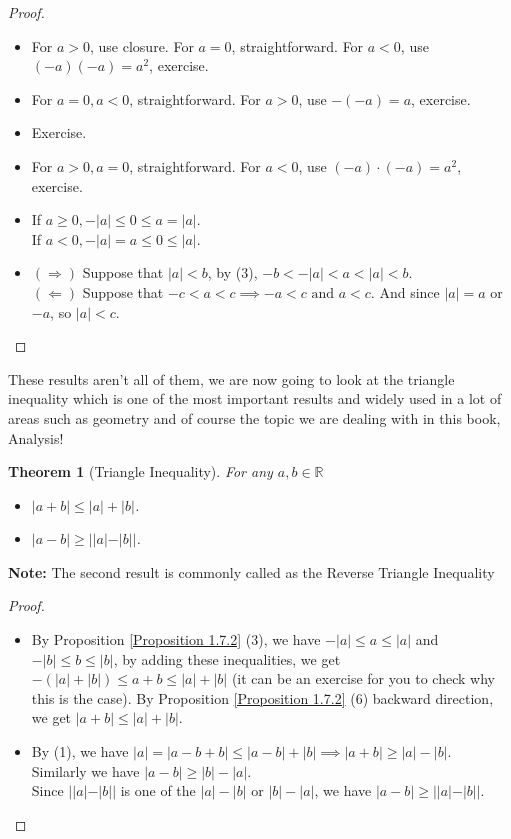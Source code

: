 \documentclass{book}
\newtheorem{theorem}{Theorem}[section]
\begin{document}
\begin{proof}
    \begin{itemize}[itemsep = 0pt]
        \item[(1)] For $a > 0$, use closure. For $a = 0$, straightforward. For $a < 0$, use $(-a)(-a) = a^{2}$, exercise.
        \item[(2)] For $a = 0, a < 0$, straightforward. For $a > 0$, use $-(-a) = a$, exercise.
        \item[(3)] Exercise.
        \item[(4)] For $a > 0, a = 0$, straightforward. For $a < 0$, use $(-a) \cdot (-a) = a^{2}$, exercise.
        \item[(5)] If $a \geq 0, -|a| \leq 0 \leq a = |a|$. \\
        If $a < 0, -|a| = a \leq 0 \leq |a|$.
        \item[(6)] $(\Rightarrow)$ Suppose that $|a| < b$, by (3), $-b < -|a| < a < |a| < b$. \\
        $(\Leftarrow)$ Suppose that $-c < a < c \implies -a < c \text{ and } a < c$. And since $|a| = a$ or $-a$, so $|a| < c$.
    \end{itemize}
\end{proof}
These results aren't all of them, we are now going to look at the triangle inequality which is one of the most important results and widely used in a lot of areas such as geometry and of course the topic we are dealing with in this book, Analysis!
\begin{theorem}[Triangle Inequality]
    For any $a, b \in \mathbb{R}$
    \begin{itemize}[itemsep = 0pt]
        \item[(1)] $|a + b| \leq |a| + |b|$.
        \item[(2)] $|a - b| \geq ||a| - |b||$.
    \end{itemize}
\end{theorem}

\textbf{Note:} The second result is commonly called as the Reverse Triangle Inequality
\begin{proof}
    \begin{itemize}[itemsep = 0pt]
        \item[(1)] By Proposition \ref{Proposition 1.7.2} (3), we have $-|a| \leq a \leq |a|$ and $-|b| \leq b \leq |b|$, by adding these inequalities, we get $-(|a| + |b|) \leq a + b \leq |a| + |b|$ (it can be an exercise for you to check why this is the case). By Proposition \ref{Proposition 1.7.2} (6) backward direction, we get $|a + b| \leq |a| + |b|$.
        \item[(2)] By (1), we have $|a| = |a - b + b| \leq |a - b| + |b| \implies |a + b| \geq |a| - |b|$. \\
        Similarly we have $|a - b| \geq |b| - |a|$. \\
        Since $||a| - |b||$ is one of the $|a| - |b|$ or $|b| - |a|$, we have $|a - b| \geq ||a| - |b||$.
    \end{itemize}
\end{proof}
\end{document}
